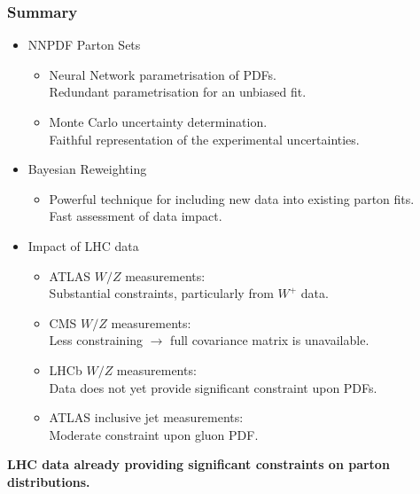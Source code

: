 \documentclass[10pt]{beamer}
\begin{document}
\begin{frame}
\frametitle{Summary}

\begin{itemize}
\item<1-> NNPDF Parton Sets
\begin{itemize}\footnotesize
		\item<1-> Neural Network parametrisation of PDFs. \\
		{ \color{blue} Redundant parametrisation for an unbiased fit.}
		\item<1-> Monte Carlo uncertainty determination.\\
		{ \color{blue}Faithful representation of the experimental uncertainties.}
		\end{itemize}
\item<1-> Bayesian Reweighting
\begin{itemize}\footnotesize
		\item<1-> Powerful technique for including new data into existing parton fits. \\
		{ \color{blue} Fast assessment of data impact.}
		\end{itemize}
\item<1-> Impact of LHC data
\begin{itemize}\footnotesize
		\item<1-> ATLAS $W/Z$ measurements:\\
		{ \color{blue} Substantial constraints, particularly from $W^{+}$ data.}

		\item<1-> CMS $W/Z$ measurements:\\
		{ \color{blue}  Less constraining $\to$ full covariance matrix is unavailable.}\\
		\item<1-> LHCb $W/Z$ measurements:\\
		 { \color{blue} Data does not yet provide significant constraint upon PDFs.}\\
		
		\item<1-> ATLAS inclusive jet measurements:\\
		{ \color{blue} Moderate constraint upon gluon PDF.}

		\end{itemize}
\end{itemize}
\begin{centering}
\textbf{ LHC data already providing significant constraints on parton distributions.}\\
\end{centering}

\end{frame}
\end{document}
